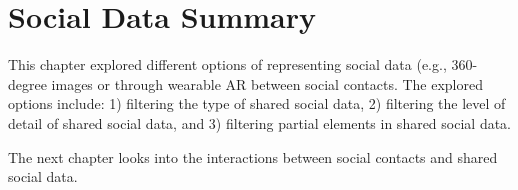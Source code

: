 \section{Social Data Summary}

This chapter explored different options of representing social data (e.g., 360-degree images or  through wearable AR between social contacts. The explored options include: 1) filtering the type of shared social data, 2) filtering the level of detail of shared social data, and 3) filtering partial elements in shared social data. 

The next chapter looks into the interactions between social contacts and shared social data. 